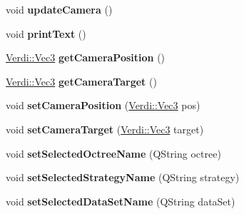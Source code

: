 \begin{DoxyCompactItemize}
\item 
\hypertarget{class_display_g_l_widget_aef83163ba7f688b783a0b2abf9cc3449}{void {\bfseries update\-Camera} ()}\label{class_display_g_l_widget_aef83163ba7f688b783a0b2abf9cc3449}

\item 
\hypertarget{class_display_g_l_widget_a55e844278e5b4114dbd7784c446ace27}{void {\bfseries print\-Text} ()}\label{class_display_g_l_widget_a55e844278e5b4114dbd7784c446ace27}

\item 
\hypertarget{class_display_g_l_widget_aab1d2de1518f7816b3a2efb6467f5af4}{\hyperlink{class_verdi_1_1_vec3}{\-Verdi\-::\-Vec3} {\bfseries get\-Camera\-Position} ()}\label{class_display_g_l_widget_aab1d2de1518f7816b3a2efb6467f5af4}

\item 
\hypertarget{class_display_g_l_widget_afc19ce417e94c73edc96c9c3c54640f6}{\hyperlink{class_verdi_1_1_vec3}{\-Verdi\-::\-Vec3} {\bfseries get\-Camera\-Target} ()}\label{class_display_g_l_widget_afc19ce417e94c73edc96c9c3c54640f6}

\item 
\hypertarget{class_display_g_l_widget_aae37b7c4cf89e4f2d6292fc823f3a3bf}{void {\bfseries set\-Camera\-Position} (\hyperlink{class_verdi_1_1_vec3}{\-Verdi\-::\-Vec3} pos)}\label{class_display_g_l_widget_aae37b7c4cf89e4f2d6292fc823f3a3bf}

\item 
\hypertarget{class_display_g_l_widget_aa110d58ddf9fe82ef67d4e2b21eaa500}{void {\bfseries set\-Camera\-Target} (\hyperlink{class_verdi_1_1_vec3}{\-Verdi\-::\-Vec3} target)}\label{class_display_g_l_widget_aa110d58ddf9fe82ef67d4e2b21eaa500}

\item 
\hypertarget{class_display_g_l_widget_a2bbc3d482ea2f3c4d4eef7860a88fd4e}{void {\bfseries set\-Selected\-Octree\-Name} (\-Q\-String octree)}\label{class_display_g_l_widget_a2bbc3d482ea2f3c4d4eef7860a88fd4e}

\item 
\hypertarget{class_display_g_l_widget_a32cdd594d8bf76deea800083ee38f1be}{void {\bfseries set\-Selected\-Strategy\-Name} (\-Q\-String strategy)}\label{class_display_g_l_widget_a32cdd594d8bf76deea800083ee38f1be}

\item 
\hypertarget{class_display_g_l_widget_a04208883145d5b9b4937da943f187877}{void {\bfseries set\-Selected\-Data\-Set\-Name} (\-Q\-String data\-Set)}\label{class_display_g_l_widget_a04208883145d5b9b4937da943f187877}


\end{DoxyCompactItemize}

